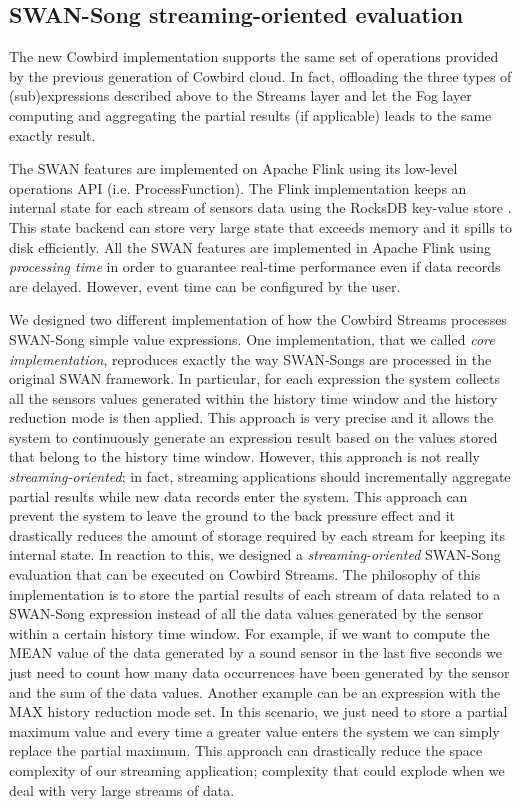 \subsection{SWAN-Song streaming-oriented evaluation}
The new Cowbird implementation supports the same set of operations provided by the previous generation of Cowbird cloud. In fact, offloading the three types of (sub)expressions described above to the Streams layer and let the Fog layer computing and aggregating the partial results (if applicable) leads to the same exactly result.

The SWAN features are implemented on Apache Flink using its low-level operations API (i.e. ProcessFunction). The Flink implementation keeps an internal state for each stream of sensors data using the RocksDB key-value store \cite{rocksdbonline}. This state backend can store very large state that exceeds memory and it spills to disk efficiently. All the SWAN features are implemented in Apache Flink using \emph{processing time} in order to guarantee real-time performance even if data records are delayed. However, event time can be configured by the user.

We designed two different implementation of how the Cowbird Streams processes SWAN-Song simple value expressions. One implementation, that we called \emph{core implementation}, reproduces exactly the way SWAN-Songs are processed in the original SWAN framework. In particular, for each expression the system collects all the sensors values generated within the history time window and the history reduction mode is then applied. This approach is very precise and it allows the system to continuously generate an expression result based on the values stored that belong to the history time window. However, this approach is not really \emph{streaming-oriented}; in fact, streaming applications should incrementally aggregate partial results while new data records enter the system. This approach can prevent the system to leave the ground to the back pressure effect and it drastically reduces the amount of storage required by each stream for keeping its internal state. In reaction to this, we designed a \emph{streaming-oriented} SWAN-Song evaluation that can be executed on Cowbird Streams. The philosophy of this implementation is to store the partial results of each stream of data related to a SWAN-Song expression instead of all the data values generated by the sensor within a certain history time window. For example, if we want to compute the MEAN value of the data generated by a sound sensor in the last five seconds we just need to count how many data occurrences have been generated by the sensor and the sum of the data values. Another example can be an expression with the MAX history reduction mode set. In this scenario, we just need to store a partial maximum value and every time a greater value enters the system we can simply replace the partial maximum. This approach can drastically reduce the space complexity of our streaming application; complexity that could explode when we deal with very large streams of data. 

